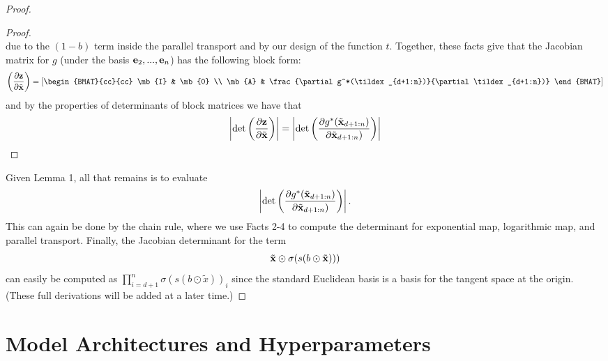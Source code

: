 \begin{proof}
\begin{proof}
\begin{equation}
\end{equation}
due to the $(1-b)$ term inside the parallel transport and by our design of the function $t$. 
Together, these facts give that the Jacobian matrix for $g$ (under the basis $\mathbf{e}_2, ..., \mathbf{e}_n$) has the following block form:
\begin{equation}
   \left(\frac{\partial \mb{z}}{\partial \tildex}\right) = \left[\begin{BMAT}{cc}{cc}
    \mb{I} & \mb{0} \\
    \mb{A} & \frac{\partial g^*(\tildex_{d+1:n})}{\partial \tildex_{d+1:n})}
    \end{BMAT}\right]
\end{equation}
and by the properties of determinants of block matrices we have that
\begin{equation}
    \left|\textnormal{det}\left(\frac{\partial \mathbf{z}}{\partial \tilde{\mathbf{x}}}\right)\right| =    \left|\textnormal{det}\left(\frac{\partial g^*(\tilde{\mathbf{x}}_{d+1:n})}{\partial \tilde{\mathbf{x}}_{d+1:n})}\right)\right|
\end{equation}
\end{proof}
Given Lemma 1, all that remains is to evaluate 
\begin{equation}
    \left|\textnormal{det}\left(\frac{\partial g^*(\tilde{\mathbf{x}}_{d+1:n})}{\partial \tilde{\mathbf{x}}_{d+1:n})}\right)\right|.
\end{equation}
This can again be done by the chain rule, where we use Facts 2-4 to compute the determinant for exponential map, logarithmic map, and parallel transport.
Finally, the Jacobian determinant for the term
\begin{equation}
    \tilde{\mathbf{x}} \odot \sigma(s(b \odot \tilde{\mathbf{x}})))
\end{equation}
can easily be computed as $\prod_{i=d+1}^n\sigma(s(b \odot \tilde{x}))_i$ since the standard Euclidean basis is a basis for the tangent space at the origin.
(These full derivations will be added at a later time.)
\end{proof}

\cut{}

\section{Model Architectures and Hyperparameters}
\label{model_arch_and_hyperparams}